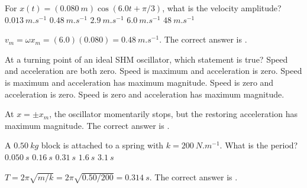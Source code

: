 \documentclass[full,print,11pt,a4paper]{physicsquiz}
\begin{document}
\begin{quizbank}
  \begin{quizquestion}[
    id=ow-shm-004,
    topic=simple-harmonic-motion,
    difficulty=applied,
    marks=1,
    correct=B,
    tags={velocity-amplitude},
    outcome={Compute velocity amplitude in SHM}
  ]
    For \(x(t)=(\SI{0.080}{m})\cos(6.0t+\pi/3)\), what is the velocity amplitude?
    \choices
      {\(\SI{0.013}{m.s^{-1}}\)}
      {\(\SI{0.48}{m.s^{-1}}\)}
      {\(\SI{2.9}{m.s^{-1}}\)}
      {\(\SI{6.0}{m.s^{-1}}\)}
      {\(\SI{48}{m.s^{-1}}\)}
  \end{quizquestion}
  \begin{quizsolution}
    \(v_m=\omega x_m=(6.0)(0.080)=\SI{0.48}{m.s^{-1}}\). The correct answer is
    \quizcorrectletter.
  \end{quizsolution}

  \begin{quizquestion}[
    id=ow-shm-005,
    topic=simple-harmonic-motion,
    difficulty=foundation,
    marks=1,
    correct=E,
    tags={phase,turning-points},
    outcome={Identify speed and acceleration at an extreme point}
  ]
    At a turning point of an ideal SHM oscillator, which statement is true?
    \choices
      {Speed and acceleration are both zero.}
      {Speed is maximum and acceleration is zero.}
      {Speed is maximum and acceleration has maximum magnitude.}
      {Speed is zero and acceleration is zero.}
      {Speed is zero and acceleration has maximum magnitude.}
  \end{quizquestion}
  \begin{quizsolution}
    At \(x=\pm x_m\), the oscillator momentarily stops, but the restoring
    acceleration has maximum magnitude. The correct answer is
    \quizcorrectletter.
  \end{quizsolution}

  \begin{quizquestion}[
    id=ow-spring-006,
    topic=spring-oscillator,
    difficulty=applied,
    marks=1,
    correct=C,
    tags={spring,period},
    outcome={Compute the period of a spring-block oscillator}
  ]
    A \(\SI{0.50}{kg}\) block is attached to a spring with
    \(k=\SI{200}{N.m^{-1}}\). What is the period?
    \choices
      {\(\SI{0.050}{s}\)}
      {\(\SI{0.16}{s}\)}
      {\(\SI{0.31}{s}\)}
      {\(\SI{1.6}{s}\)}
      {\(\SI{3.1}{s}\)}
  \end{quizquestion}
  \begin{quizsolution}
    \(T=2\pi\sqrt{m/k}=2\pi\sqrt{0.50/200}=\SI{0.314}{s}\). The correct answer
    is \quizcorrectletter.
  \end{quizsolution}


\end{quizbank}
\end{document}
